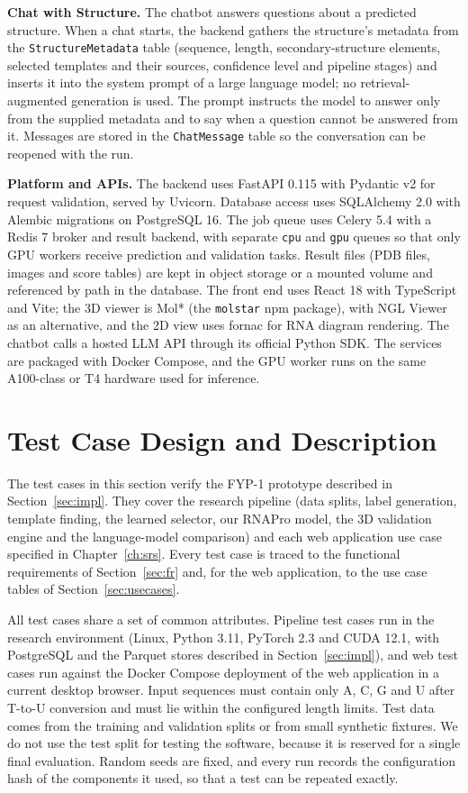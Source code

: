 \documentclass{FastFyp}
\begin{document}
\textbf{Chat with Structure.} The chatbot answers questions about a predicted structure. When a chat starts, the backend gathers the structure's metadata from the \texttt{StructureMetadata} table (sequence, length, secondary-structure elements, selected templates and their sources, confidence level and pipeline stages) and inserts it into the system prompt of a large language model; no retrieval-augmented generation is used. The prompt instructs the model to answer only from the supplied metadata and to say when a question cannot be answered from it. Messages are stored in the \texttt{ChatMessage} table so the conversation can be reopened with the run.

\textbf{Platform and APIs.} The backend uses FastAPI 0.115 with Pydantic v2 for request validation, served by Uvicorn. Database access uses SQLAlchemy 2.0 with Alembic migrations on PostgreSQL 16. The job queue uses Celery 5.4 with a Redis 7 broker and result backend, with separate \texttt{cpu} and \texttt{gpu} queues so that only GPU workers receive prediction and validation tasks. Result files (PDB files, images and score tables) are kept in object storage or a mounted volume and referenced by path in the database. The front end uses React 18 with TypeScript and Vite; the 3D viewer is Mol* (the \texttt{molstar} npm package), with NGL Viewer as an alternative, and the 2D view uses fornac for RNA diagram rendering. The chatbot calls a hosted LLM API through its official Python SDK. The services are packaged with Docker Compose, and the GPU worker runs on the same A100-class or T4 hardware used for inference.

\section{Test Case Design and Description}
\label{sec:testcases}
The test cases in this section verify the FYP-1 prototype described in Section~\ref{sec:impl}. They cover the research pipeline (data splits, label generation, template finding, the learned selector, our RNAPro model, the 3D validation engine and the language-model comparison) and each web application use case specified in Chapter~\ref{ch:srs}. Every test case is traced to the functional requirements of Section~\ref{sec:fr} and, for the web application, to the use case tables of Section~\ref{sec:usecases}.

All test cases share a set of common attributes. Pipeline test cases run in the research environment (Linux, Python 3.11, PyTorch 2.3 and CUDA 12.1, with PostgreSQL and the Parquet stores described in Section~\ref{sec:impl}), and web test cases run against the Docker Compose deployment of the web application in a current desktop browser. Input sequences must contain only A, C, G and U after T-to-U conversion and must lie within the configured length limits. Test data comes from the training and validation splits or from small synthetic fixtures. We do not use the test split for testing the software, because it is reserved for a single final evaluation. Random seeds are fixed, and every run records the configuration hash of the components it used, so that a test can be repeated exactly.
\end{document}
